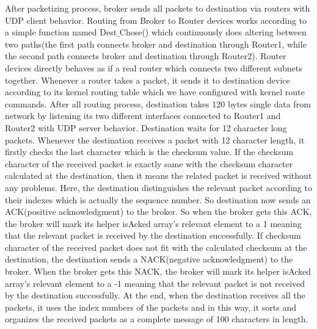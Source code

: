 \documentclass[conference]{IEEEtran}
\begin{document}
After packetizing process, broker sends all packets to destination via routers with UDP client behavior. Routing from Broker to Router devices works according to a simple function named Dest$\_$Chose() which continuously does altering between two paths(the first path connects broker and destination through Router1, while the second path connects broker and destination through Router2). Router devices directly behaves as if a real router which connects two different subnets together. Whenever a router takes a packet, it sends it to destination device according to its kernel routing table which we have configured with kernel route commands. After all routing process, destination takes 120 bytes single data from network by listening its two different interfaces connected to Router1 and Router2 with UDP server behavior. Destination waits for 12 character long packets. Whenever the destination receives a packet with 12 character length, it firstly checks the last character which is the checksum value. If the checksum character of the received packet is exactly same with the checksum character calculated at the destination, then it means the related packet is received without any problems. Here, the destination distinguishes the relevant packet according to their indexes which is actually the sequence number. So destination now sends an ACK(positive acknowledgment) to the broker. So when the broker gets this ACK, the broker will mark its helper isAcked array's relevant element to a 1 meaning that the relevant packet is received by the destination successfully. If checksum character of the received packet does not fit with the calculated checksum at the destination, the destination sends a NACK(negative acknowledgment) to the broker. When the broker gets this NACK, the broker will mark its helper isAcked array's relevant element to a -1 meaning that the relevant packet is not received by the destination successfully. At the end, when the destination receives all the packets, it uses the index numbers of the packets and in this way, it sorts and organizes the received packets as a complete message of 100 characters in length. 
\end{document}
